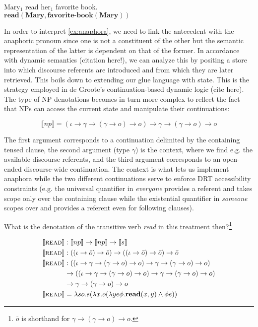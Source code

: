 \documentclass{article}
\newcommand{\sem}[1]{\llbracket #1 \rrbracket}
\begin{document}
\begin{exe}
  \ex \label{ex:anaphora} Mary$_1$ read her$_1$ favorite book. \\
  $\textbf{read}(\textbf{Mary}, \textbf{favorite-book}(\textbf{Mary}))$
\end{exe}

In order to interpret \eqref{ex:anaphora}, we need to link the antecedent with
the anaphoric pronoun since one is not a constituent of the other but the
semantic representation of the latter is dependent on that of the former. In
accordance with dynamic semantics (citation here!), we can analyze this by
positing a store into which discourse referents are introduced and from which
they are later retrieved. This boils down to extending our glue language with
state. This is the strategy employed in de Groote's continuation-based dynamic
logic (cite here). The type of NP denotations becomes in turn more complex to
reflect the fact that NPs can access the current state and manipulate their
continuations:

$$
\sem{np} = (\iota \to \gamma \to (\gamma \to o) \to o) \to \gamma \to (\gamma
\to o) \to o
$$

The first argument corresponds to a continuation delimited by the containing
tensed clause, the second argument (type $\gamma$) is the context, where we
find e.g. the available discourse referents, and the third argument
corresponds to an open-ended discourse-wide continuation. The context is what
lets us implement anaphora while the two different continuations serve to
enforce DRT accessibility constraints (e.g. the universal quantifier in
\emph{everyone} provides a referent and takes scope only over the containing
clause while the existential quantifier in \emph{someone} scopes over and
provides a referent even for following clauses).

What is the denotation of the transitive verb \emph{read} in this treatment
then?\footnote{$\bar{o}$ is shorthand for $\gamma \to (\gamma \to o) \to o$.}

\begin{align*}
  \sem{\textsc{read}} & : \sem{np} \to \sem{np} \to \sem{s} \\
  \sem{\textsc{read}} & : ((\iota \to \bar{o}) \to \bar{o}) \to
                          ((\iota \to \bar{o}) \to \bar{o}) \to
                          \bar{o} \\
  \sem{\textsc{read}} & : ((\iota \to \gamma \to (\gamma \to o) \to o)
                           \to \gamma \to (\gamma \to o) \to o) \\ & \to
                          ((\iota \to \gamma \to (\gamma \to o) \to o)
                           \to \gamma \to (\gamma \to o) \to o) \\ & \to
                           \gamma \to (\gamma \to o) \to o \\
  \sem{\textsc{read}} & = \lambda s o. s (\lambda x. o (\lambda y e
  \phi. \textbf{read}(x, y) \land \phi e))
\end{align*}
\end{document}
